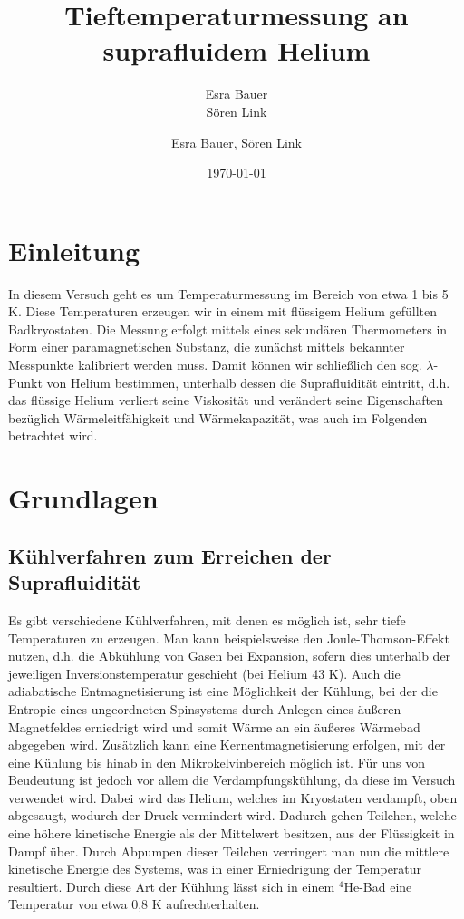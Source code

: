 \documentclass[bigchapter,colorback,accentcolor=tud4b,linedtoc,11pt]{tudreport}
\title{Tieftemperaturmessung an suprafluidem Helium}
\subtitle{Esra Bauer \\Sören Link}
\author{Esra Bauer, Sören Link}
\date{\today}
\begin{document}

\maketitle

\tableofcontents


\chapter{Einleitung}

In diesem Versuch geht es um Temperaturmessung im Bereich von etwa 1 bis 5 K. Diese Temperaturen erzeugen wir in einem mit flüssigem Helium gefüllten Badkryostaten. Die Messung erfolgt mittels eines sekundären Thermometers in Form einer paramagnetischen Substanz, die zunächst mittels bekannter Messpunkte kalibriert werden muss. Damit können wir schließlich den sog. $\lambda$-Punkt von Helium bestimmen, unterhalb dessen die Suprafluidität eintritt, d.h. das flüssige Helium verliert seine Viskosität und verändert seine Eigenschaften bezüglich Wärmeleitfähigkeit und Wärmekapazität, was auch im Folgenden betrachtet wird.

\chapter{Grundlagen}

\section{Kühlverfahren zum Erreichen der Suprafluidität}

Es gibt verschiedene Kühlverfahren, mit denen es möglich ist, sehr tiefe Temperaturen zu erzeugen. Man kann beispielsweise den Joule-Thomson-Effekt nutzen, d.h. die Abkühlung von Gasen bei Expansion, sofern dies unterhalb der jeweiligen Inversionstemperatur geschieht (bei Helium 43 K). Auch die adiabatische Entmagnetisierung ist eine Möglichkeit der Kühlung, bei der die Entropie eines ungeordneten Spinsystems durch Anlegen eines äußeren Magnetfeldes erniedrigt wird und somit Wärme an ein äußeres Wärmebad abgegeben wird. Zusätzlich kann eine Kernentmagnetisierung erfolgen, mit der eine Kühlung bis hinab in den Mikrokelvinbereich möglich ist. Für uns von Beudeutung ist jedoch vor allem die Verdampfungskühlung, da diese im Versuch verwendet wird. Dabei wird das Helium, welches im Kryostaten verdampft, oben abgesaugt, wodurch der Druck vermindert wird. Dadurch gehen Teilchen, welche eine höhere kinetische Energie als der Mittelwert besitzen, aus der Flüssigkeit in Dampf über. Durch Abpumpen dieser Teilchen verringert man nun die mittlere kinetische Energie des Systems, was in einer Erniedrigung der Temperatur resultiert. Durch diese Art der Kühlung lässt sich in einem $^4$He-Bad eine Temperatur von etwa 0,8 K aufrechterhalten. 
\end{document}
